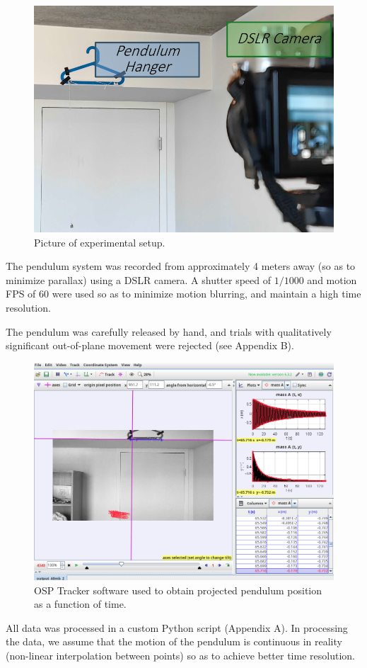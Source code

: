 \documentclass[prl,twocolumn,amsmath,amssymb,superscriptaddress]{revtex4-2}
\begin{document}
\begin{figure}[htb]
    \includegraphics[width=0.6\linewidth]{setup.png}
    \caption{Picture of experimental setup.}
    \label{fig:experiment_setup}
\end{figure}

\newpage

The pendulum system was recorded from approximately 4 meters away (so as to minimize parallax) using a DSLR camera. A shutter speed of $1/1000$ and motion FPS of $60$ were used so as to minimize motion blurring, and maintain a high time resolution.

The pendulum was carefully released by hand, and trials with qualitatively significant out-of-plane movement were rejected (see Appendix B).



\begin{figure}[htb]
    \includegraphics[width=0.7\linewidth]{tracker.png}
    \caption{OSP Tracker software used to obtain projected pendulum position as a function of time.}
    \label{fig:tracker}
\end{figure}

All data was processed in a custom Python script (Appendix A). In processing the data, we assume that the motion of the pendulum is continuous in reality (non-linear interpolation between points) so as to achieve better time resolution.
\end{document}
